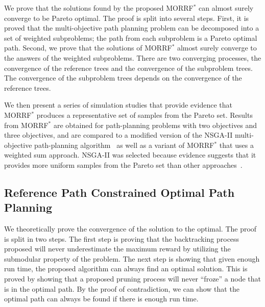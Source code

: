 \documentclass[phd]{byuprop}
\begin{document}
We prove that the solutions found by the proposed MORRF$^{*}$ can almost surely converge to be Pareto optimal.
The proof is split into several steps.
First, it is proved that the multi-objective path planning problem can be decomposed into a set of weighted subproblems;
the path from each subproblem is a Pareto optimal path.
Second, we prove that the solutions of MORRF$^{*}$ almost surely converge to the answers of the weighted subproblems.
There are two converging processes, the convergence of the reference trees and the convergence of the subproblem trees.
The convergence of the subproblem trees depends on the convergence of the reference trees.

We then present a series of simulation studies that provide evidence that MORRF$^{*}$ produces a representative set of samples from the Pareto set.
Results from MORRF$^{*}$ are obtained for path-planning problems with two objectives and three objectives, and are compared to a modified version of the NSGA-II multi-objective path-planning algorithm~\cite{Ahmed2013} as well as a variant of MORRF$^{*}$ that uses a weighted sum approach.
NSGA-II was selected because evidence suggests that it provides more uniform samples from the Pareto set than other approaches~\cite{Deb2002}.

\subsection{Reference Path Constrained Optimal Path Planning}

We theoretically prove the convergence of the solution to the optimal.
The proof is split in two steps.
The first step is proving that the backtracking process proposed will never underestimate the maximum reward by utilizing the submodular property of the problem.
The next step is showing that given enough run time, the proposed algorithm can always find an optimal solution.
This is proved by showing that a proposed pruning process will never ``froze'' a node that is in the optimal path.
By the proof of contradiction, we can show that the optimal path can always be found if there is enough run time.
\end{document}
